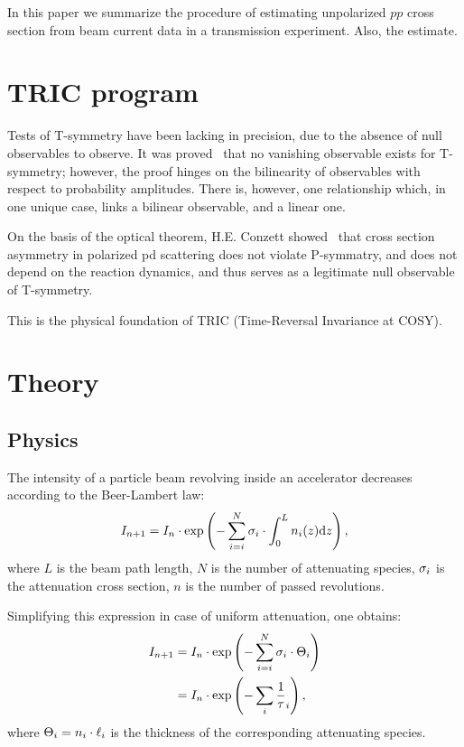 \documentclass[reprint]{revtex4-1}
\newcommand{\td}{\mathrm{d}}
\begin{document}
\begin{abstractname}
In this paper we summarize the procedure of estimating unpolarized $pp$ cross section from beam current data in a transmission experiment. Also, the estimate.
\end{abstractname}

\section{TRIC program}

Tests of T-symmetry have been lacking in precision, due to the absence of null observables to observe. It was proved~\cite{NoNullObs} that no vanishing observable exists for T-symmetry; however, the proof hinges on the bilinearity of observables with respect to probability amplitudes. There is, however, one relationship which, in one unique case, links a bilinear observable, and a linear one.

On the basis of the optical theorem, H.E. Conzett showed~\cite{Conzett} that cross section asymmetry in polarized pd scattering does not violate P-symmatry, and does not depend on the reaction dynamics, and thus serves as a legitimate null observable of T-symmetry.

This is the physical foundation of TRIC (Time-Reversal Invariance at COSY).

\section{Theory}
\subsection{Physics}
The intensity of a particle beam revolving inside an accelerator decreases according to the Beer-Lambert law:
\[
	I_{n+1} = I_n \cdot \exp\bkt{-\sum_{i=i}^N \CS[i]\cdot\int_0^L n_i(z)\td z},
\]
where $L$ is the beam path length, $N$ is the number of attenuating species, $\CS[i]$ is the attenuation cross section, $n$ is the number of passed revolutions.

Simplifying this expression in case of uniform attenuation, one obtains:
\begin{align*}
	I_{n+1} &= I_n \cdot \exp\bkt{-\sum_{i=i}^N \CS[i]\cdot \Thick[i]} \\
			&= I_n \cdot \exp\bkt{-\sum_i\frac1\tau_i},
\end{align*}
where $\Thick[i] = n_i\cdot\ell_i$ is the thickness of the corresponding attenuating species.
\end{document}
